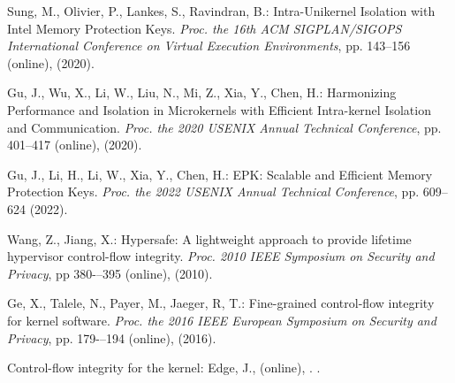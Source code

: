 \documentclass[english,preprint,JIP]{ipsj}
\begin{document}
\begin{thebibliography}{99}
  Sung, M., Olivier, P., Lankes, S., Ravindran, B.: Intra-Unikernel Isolation with Intel Memory Protection Keys.
  \textit{Proc. the 16th ACM SIGPLAN/SIGOPS International Conference on Virtual Execution Environments}, pp. 143--156 (online),  (2020).

  Gu, J., Wu, X., Li, W., Liu, N., Mi, Z., Xia, Y., Chen, H.: Harmonizing Performance and Isolation in Microkernels with Efficient Intra-kernel Isolation and Communication.
  \textit{Proc. the 2020 USENIX Annual Technical Conference}, pp. 401--417 (online),  (2020).
  
  Gu, J., Li, H., Li, W., Xia, Y., Chen, H.: EPK: Scalable and Efficient Memory Protection Keys.
  \textit{Proc. the 2022 USENIX Annual Technical Conference}, pp. 609--624 (2022).
  
  Wang, Z., Jiang, X.: Hypersafe: A lightweight approach to provide lifetime hypervisor control-flow integrity. 
  \textit{Proc. 2010 IEEE Symposium on Security and Privacy}, pp 380-–395 (online),  (2010).

  Ge, X., Talele, N., Payer, M., Jaeger, R, T.: Fine-grained control-flow integrity for kernel software. 
  \textit{Proc. the 2016 IEEE European Symposium on Security and Privacy}, pp. 179-–194 (online),  (2016).

  Control-flow integrity for the kernel: Edge, J., (online), . .


\end{thebibliography}
\end{document}
